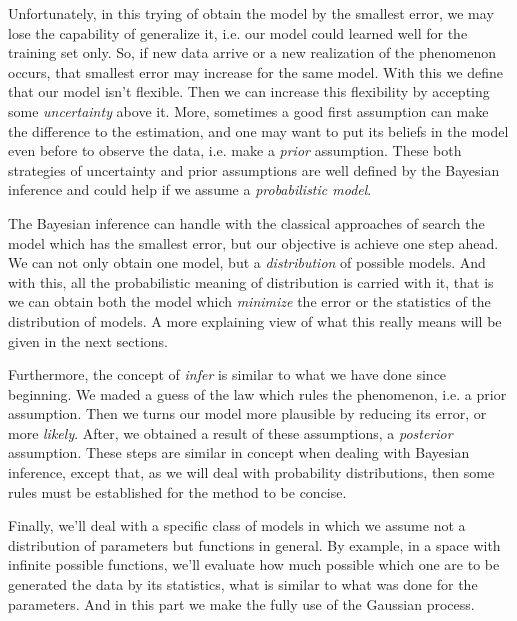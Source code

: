 \documentclass[11pt]{article} %
\begin{document}

Unfortunately, in this trying of obtain the model by the smallest error, we may lose the capability of generalize it, i.e. our model could learned well for the training set only. So, if new data arrive or a new realization of the phenomenon occurs, that smallest error may increase for the same model. With this we define that our model isn't flexible. Then we can increase this flexibility by accepting some \textit{uncertainty} above it. More, sometimes a good first assumption can make the difference to the estimation, and one may want to put its beliefs in the model even before to observe the data, i.e. make a \textit{prior} assumption. These both strategies of uncertainty and prior assumptions are well defined by the Bayesian inference and could help if we assume a \textit{probabilistic model}.

The Bayesian inference can handle with the classical approaches of search the model which has the smallest error, but our objective is achieve one step ahead. We can not only obtain one model, but a \textit{distribution} of possible models. And with this, all the probabilistic meaning of distribution is carried with it, that is we can obtain both the model which \textit{minimize} the error or the statistics of the distribution of models. A more explaining view of what this really means will be given in the next sections.

Furthermore, the concept of \textit{infer} is similar to what we have done since beginning. We maded a guess of the law which rules the phenomenon, i.e. a prior assumption. Then we turns our model more plausible by reducing its error, or more \textit{likely}. After, we obtained a result of these assumptions, a \textit{posterior} assumption. These steps are similar in concept when dealing with Bayesian inference,  except that, as we will deal with probability distributions, then some rules must be established for the method to be concise.

Finally, we'll deal with a specific class of models in which we assume not a distribution of parameters but functions in general. By example, in a space with infinite possible functions, we'll evaluate how much possible which one are to be generated the data by its statistics, what is similar to what was done for the parameters. And in this part we make the fully use of the Gaussian process.
\end{document}
